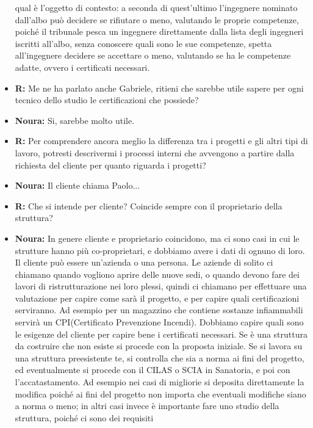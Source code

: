 \documentclass{elegantbook}
\begin{document}
\begin{itemize}
                    qual è l'oggetto di contesto: a seconda di quest'ultimo l'ingegnere nominato dall'albo può decidere se rifiutare o meno, valutando le proprie competenze,
                    poiché il tribunale pesca un ingegnere direttamente dalla lista degli ingegneri iscritti all'albo, senza conoscere quali sono le sue competenze, spetta
                    all'ingegnere decidere se accettare o meno, valutando se ha le competenze adatte, ovvero i certificati necessari.
		\item \textbf{R:} Me ne ha parlato anche Gabriele, ritieni che sarebbe utile sapere per ogni tecnico dello studio le certificazioni che possiede?
		\item \textbf{Noura:} Si, sarebbe molto utile.
		\item \textbf{R:} Per comprendere ancora meglio la differenza tra i progetti e gli altri tipi di lavoro, potresti descrivermi i processi interni che avvengono
                    a partire dalla richiesta del cliente per quanto riguarda i progetti?
		\item \textbf{Noura:} Il cliente chiama Paolo...
		\item \textbf{R:} Che si intende per cliente? Coincide sempre con il proprietario della struttura?
		\item \textbf{Noura:} In genere cliente e proprietario coincidono, ma ci sono casi in cui le strutture hanno più co-proprietari, e dobbiamo avere i dati di
                    ognuno di loro. Il cliente può essere un'azienda o una persona. Le aziende di solito ci chiamano quando vogliono aprire delle nuove sedi, o quando
                    devono fare dei lavori di ristrutturazione nei loro plessi, quindi ci chiamano per effettuare una valutazione per capire come sarà il progetto, e per 
                    capire quali certificazioni serviranno. Ad esempio per un magazzino che contiene sostanze infiammabili servirà un CPI(Certificato Prevenzione Incendi). 
                    Dobbiamo capire quali sono le esigenze del cliente per capire bene i certificati necessari. Se è una struttura da costruire che non esiste si procede con 
                    la proposta iniziale. Se si lavora su una struttura preesistente te, si controlla che sia a norma ai fini del progetto, ed eventualmente si procede con il
                    CILAS o SCIA in Sanatoria, e poi con l'accatastamento. Ad esempio nei casi di migliorie si deposita direttamente la modifica poiché ai fini del progetto 
                    non importa che eventuali modifiche siano a norma o meno; in altri casi invece è importante fare uno studio della struttura, poiché ci sono dei requisiti 

\end{itemize}
\end{document}
